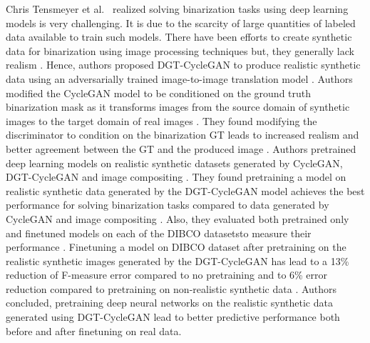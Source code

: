 Chris Tensmeyer et al.\ \cite{8978087} realized solving binarization tasks using deep learning models is very challenging. It is due to the scarcity of large quantities of labeled data available to train such models. There have been efforts to create synthetic data for binarization using image processing techniques but, they generally lack realism \cite{8978087}. Hence, authors proposed DGT-CycleGAN to produce realistic synthetic data using an adversarially trained image-to-image translation model \cite{8978087}. Authors modified the \ac{CycleGAN} model to be conditioned on the ground truth binarization mask as it transforms images from the source domain of synthetic images to the target domain of real images \cite{8978087}. They found modifying the discriminator to condition on the binarization \ac{GT} leads to increased realism and better agreement between the \ac{GT} and the produced image \cite{8978087}.  Authors pretrained deep learning models on realistic synthetic datasets generated by \ac{CycleGAN}, DGT-CycleGAN and image compositing \cite{8978087}. They found pretraining a model on realistic synthetic data generated by the DGT-CycleGAN model achieves the best performance for solving binarization tasks compared to data generated by \ac{CycleGAN} and image compositing \cite{8978087}. Also, they evaluated both pretrained only and finetuned models on each of the \ac{DIBCO} datasets\footnotemark to measure their performance \cite{8978087}. Finetuning a model on \ac{DIBCO} dataset after pretraining on the realistic synthetic images generated by the DGT-CycleGAN has lead to a 13\% reduction of F-measure error compared to no pretraining and to 6\% error reduction compared to pretraining on non-realistic synthetic data \cite{8978087}. Authors concluded, pretraining deep neural networks on the realistic synthetic data generated using DGT-CycleGAN lead to better predictive performance both before and after finetuning on real data.




